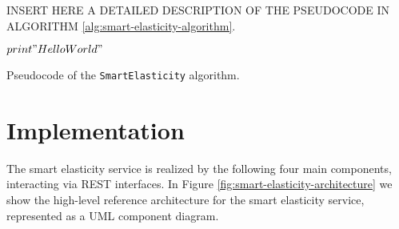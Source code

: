 INSERT HERE A DETAILED DESCRIPTION OF THE PSEUDOCODE IN ALGORITHM \ref{alg:smart-elasticity-algorithm}.

\begin{algorithm}[t]
	\label{alg:smart-elasticity-algorithm}
	
	 {
		$print "Hello World"$ \\
	}
	\caption{Pseudocode of the \texttt{SmartElasticity} algorithm.}
\end{algorithm}


\section{Implementation}
\label{sec:smart-elasticity-implementation}

The smart elasticity service is realized by the following four main components, interacting via REST interfaces.
%
In Figure \ref{fig:smart-elasticity-architecture} we show the high-level reference architecture for the smart elasticity service, represented as a UML component diagram.

